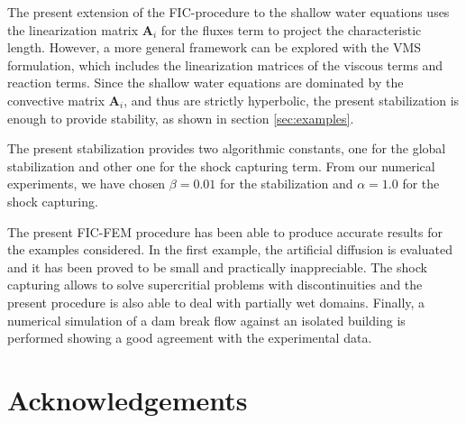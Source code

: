 \documentclass[a4paper,12pt]{article}
\newcommand\Ignasi[1]{\ifthenelse{\boolean{show_comments}}{\textcolor{blue}{#1}}{}}
\newcommand\Miguel[1]{\ifthenelse{\boolean{show_comments}}{\textcolor{red}{#1}}{}}
\newcommand\IgnasiCorregit[1]{\ifthenelse{\boolean{show_corregit}}{\textcolor{blue}{#1}}{}}
\begin{document}
The present extension of the FIC-procedure to the shallow water equations uses the linearization matrix $\mathbf{A}_i$ for the fluxes term to project the characteristic length. However, a more general framework can be explored with the VMS formulation, which includes the linearization matrices of the viscous terms and reaction terms. Since the shallow water equations are dominated by the convective matrix $\mathbf{A}_i$, and thus are strictly hyperbolic, the present stabilization is enough to provide stability, as shown in section \ref{sec:examples}.

The present stabilization provides two algorithmic constants, one for the global stabilization and other one for the shock capturing term. From our numerical experiments, we have chosen $\beta=0.01$ for the stabilization and $\alpha=1.0$ for the shock capturing. \IgnasiCorregit{REVISA QUE NO HAGIS REPETIT EL SIMBOL $\alpha$ PER A VARIS SIGNIFICATS}

The present FIC-FEM procedure has been able to produce accurate results for the examples considered.
In the first example, the artificial diffusion is evaluated and it has been proved to be small and practically inappreciable. The shock capturing allows to solve supercritial problems with discontinuities and the present procedure is also able to deal with partially wet domains. Finally, a numerical simulation of a dam break flow against an isolated building is performed showing a good agreement with the experimental data.
\IgnasiCorregit{JO AFEGIRIA UN PETIT PARAGRAF RESUMINT ELS RESULTATS OBTINGUTS ALS EXEMPLES. (NO DETALLAT, NOMES UNES PINCELLADES)}



\section{Acknowledgements}
\end{document}

